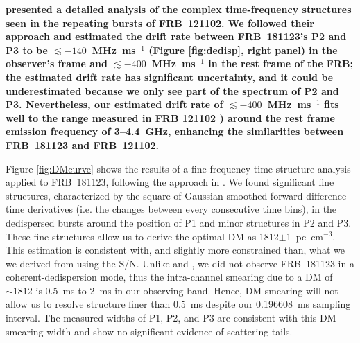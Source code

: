 {\bf \citet{hessels19} presented a detailed analysis of the complex time-frequency structures seen in the repeating bursts of FRB~121102. We followed their approach and estimated the drift rate between FRB~181123's P2 and P3 to be $\lesssim-140$~MHz~ms$^{-1}$ (Figure \ref{fig:dedisp}, right panel) in the observer's frame and $\lesssim-400$~MHz~ms$^{-1}$ in the rest frame of the FRB; the estimated drift rate has significant uncertainty, and it could be underestimated because we only see part of the spectrum of P2 and P3. 
Nevertheless, our estimated drift rate of $\lesssim-400$~MHz~ms$^{-1}$ fits well to the range measured in FRB 121102 \citet{hessels19}) around the rest frame emission frequency of 3--4.4~GHz, enhancing the similarities between FRB~181123 and FRB~121102.

Figure \ref{fig:DMcurve} shows the results of a fine frequency-time structure analysis applied to FRB~181123, following the approach in \citet{hessels19}. We found significant fine structures, characterized by the square of Gaussian-smoothed forward-difference time derivatives (i.e. the changes between every consecutive time bins), in the dedispersed bursts around the position of P1 and minor structures in P2 and P3. These fine structures allow us to derive the optimal DM as 1812$\pm$1~pc~cm$^{-3}$. This estimation is consistent with, and slightly more constrained than, what we we derived from using the S/N.
Unlike \citet{gsp+18} and \citet{hessels19}, we did not observe FRB~181123 in a coherent-dedispersion mode, thus the intra-channel smearing due to a DM of $\sim1812$ is 0.5~ms to 2~ms in our observing band. Hence,
DM smearing will not allow us to resolve structure finer than 0.5~ms despite our 0.196608~ms sampling interval.
The measured widths of P1, P2, and P3 are consistent with this DM-smearing width and show no significant evidence of scattering tails. 
}



